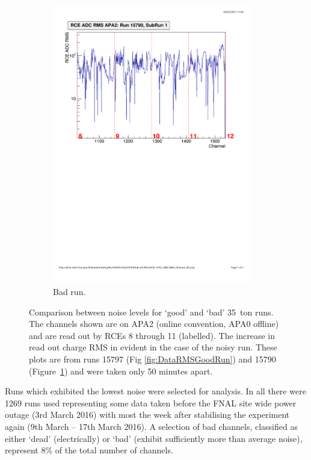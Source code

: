 \begin{figure}
\begin{subfigure}{0.45\linewidth}
  \end{subfigure}
  \hfill
  \begin{subfigure}{0.45\linewidth}
    \centering
    \includegraphics[width=0.95\textwidth]{DataRMSBad.pdf}
    \caption{Bad run.}
    \label{fig:DataRMSBadRun}
  \end{subfigure}
  \caption[Comparison between noise levels for `good' and `bad' 35~ton runs.]{Comparison between noise levels for `good' and `bad' 35~ton runs.  The channels shown are on APA2 (online convention, APA0 offline) and are read out by RCEs 8 through 11 (labelled).  The increase in read out charge RMS in evident in the case of the noisy run.  These plots are from runs 15797 (Fig \ref{fig:DataRMSGoodRun}) and 15790 (Figure~\ref{fig:DataRMSBadRun}) and were taken only 50 minutes apart.}
  \label{fig:DataRMS}
\end{figure}

Runs which exhibited the lowest noise were selected for analysis.  In all there were 1269 runs used representing some data taken before the FNAL site wide power outage (3rd March 2016) with most the week after stabilising the experiment again (9th March -- 17th March 2016).  A selection of bad channels, classified as either `dead' (electrically) or `bad' (exhibit sufficiently more than average noise), represent 8\% of the total number of channels.

